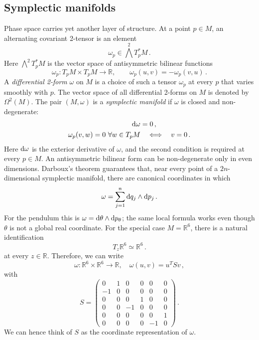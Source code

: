 \subsection{Symplectic manifolds}
Phase space carries yet another layer of structure.  At a point $p\in M$, an
alternating covariant 2-tensor is an element
\begin{equation}
    \omega_p\in\bigwedge^2 T_p^*M\,.
\end{equation}
Here $\bigwedge^2 T_p^*M$ is the vector space of antisymmetric bilinear
functions
\begin{equation}
    \omega_p:T_pM\times T_pM\longrightarrow\mathbb{R},
    \qquad \omega_p(u,v) = -\omega_p(v,u)\,.
\end{equation}
A \emph{differential 2-form} $\omega$ on $M$ is a choice of such a tensor
$\omega_p$ at every $p$ that varies smoothly with $p$.  The vector space of
all differential 2-forms on $M$ is denoted by $\Omega^2(M)$.  The pair
$(M,\omega)$ is a \emph{symplectic manifold} if $\omega$ is closed and
non-degenerate:
\begin{align}
    \text{d}\omega & = 0\,, \\
    \omega_p(v,w) = 0\ \forall w\in T_pM
    &\quad\Longleftrightarrow\quad v = 0\,.
\end{align}
Here $\text{d}\omega$ is the exterior derivative of $\omega$, and the second
condition is required at every $p\in M$.
An antisymmetric bilinear form can be non-degenerate only in even dimensions.
Darboux's theorem guarantees that, near every point of a
$2n$-dimensional symplectic manifold, there are canonical coordinates in
which
\begin{equation}
    \omega = \sum_{j = 1}^{n}\text{d} q_j\wedge\text{d} p_j\,.
\end{equation}
For the pendulum this is $\omega = \text{d}\theta\wedge\text{d} p_\theta$; the same
local formula works even though $\theta$ is not a global real coordinate.
For the special case $M = \mathbb R^6$, there is a natural identification
\begin{equation}
    T_z\mathbb R^6\simeq\mathbb R^6\,.
\end{equation}
at every $z\in \mathbb R$.  Therefore, we can write
\begin{equation}
    \omega:\mathbb R^6\times\mathbb R^6\to\mathbb R, \quad
    \omega(u,v) = u^T S v\,,
\end{equation}
with
\begin{equation}
    S = \begin{pmatrix}
    0 & 1 & 0 & 0 & 0 & 0\\
    -1 & 0 & 0 & 0 & 0 & 0\\
    0 & 0 & 0 & 1 & 0 & 0\\
    0 & 0 & -1 & 0 & 0 & 0\\
    0 & 0 & 0 & 0 & 0 & 1\\
    0 & 0 & 0 & 0 & -1 & 0
    \end{pmatrix}\,.
\end{equation}
We can hence think of $S$ as the coordinate representation of $\omega$.


